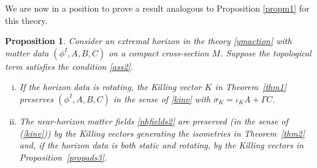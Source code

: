 \documentclass[11pt, reqno]{amsart}
\theoremstyle{plain}
\newtheorem{prop}[theorem]{Proposition}
\theoremstyle{definition}
\numberwithin{equation}{section}
\begin{document}
We are now in a position to prove a result analogous to Proposition \ref{propm1} for this theory.
\begin{prop} \label{propym}
    Consider an extremal horizon in the theory \eqref{ymaction} with matter data $(\phi^I,A,B,C)$ on a compact cross-section $M$. Suppose the topological term satisfies the condition \eqref{ass2}. 
    \begin{enumerate}[(i)]
        \item If the horizon data is rotating, the Killing vector $K$ in Theorem~\ref{thm1} preserves $(\phi^I,A,B,C)$ in the sense of \eqref{kinv} with $\sigma_K = \iota_KA + \Gamma C$. \vspace{.1cm}
        \item The near-horizon matter fields \eqref{nhfields2} are preserved (in the sense of (\ref{kinv})) by the Killing vectors generating the isometries in Theorem~\ref{thm2} and, if the horizon data is both static and rotating, by the Killing vectors in Proposition~\ref{propads3}.
    \end{enumerate}
\end{prop}
\end{document}
